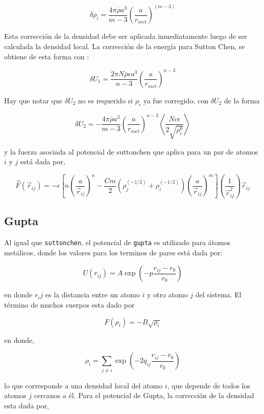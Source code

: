 $$\delta\rho_i=\frac{4\pi\overline{\rho}a^3}{m-3}\left(\frac{a}{r_{met}}\right)^{(m-3)}$$

Esta correcci\'on de la densidad debe ser aplicada inmediatamente luego de ser calculada la densidad local. La correcci\'on de la energ\'ia para Sutton Chen, se obtiene de esta forma con :

$$\delta U_1 = \frac{2\pi N\overline{\rho}\epsilon a^3}{n-3}\left(\frac{a}{r_{met}}\right)^{n-3}$$

Hay que notar que $\delta U_2$ no es requerido si $\rho_i$ ya fue corregido, con $\delta U_2$ de la forma

$$\delta U_2 = -\frac{4\pi\overline{\rho}a^3}{m-3}\left(\frac{a}{r_{met}}\right)^{n-3}\left<\frac{Nc\epsilon}{2\sqrt{\rho_i^0}}\right>$$

y la fuerza asociada al potencial de suttonchen que aplica para un par de atomos $i$ y $j$ est\'a dada por,

$$\vec{F}(\vec{r}_{ij}) = -\epsilon\left[n\left(\frac{a}{\vec{r}_{ij}}\right)^n - \frac{Cm}{2}(\rho_j^{(-1/2)}+\rho_i^{(-1/2)})\left(\frac{a}{\vec{r}_{ij}}\right)^m\right]\left(\frac{1}{\vec{r}_{ij}^2}\right)\vec{r}_{ij}$$



\subsection{Gupta}

Al igual que \verb|suttonchen|, el potencial de \verb|gupta| es utilizado para \'atomos met\'alicos, donde los valores para los terminos de pares est\'a dada por:

$$U(r_{ij}) = A\exp{\left(-p\frac{r_{ij}-r_0}{r_0}\right)}$$

en donde $r_ij$ es la distancia entre un atomo $i$ y otro atomo $j$ del sistema. El t\'ermino de muchos cuerpos esta dado por

$$F(\rho_{i}) = -B\sqrt{\rho_i}$$

en donde,

$$\rho_i = \sum_{j\neq i} \exp{\left(-2q_{ij}\frac{r_{ij}-r_0}{r_0}\right)}$$

lo que corresponde a una densidad local del atomo $i$, que depende de todos los atomos $j$ cercanos a \'el. Para el potencial de Gupta, la correcci\'on de la densidad esta dada por,

